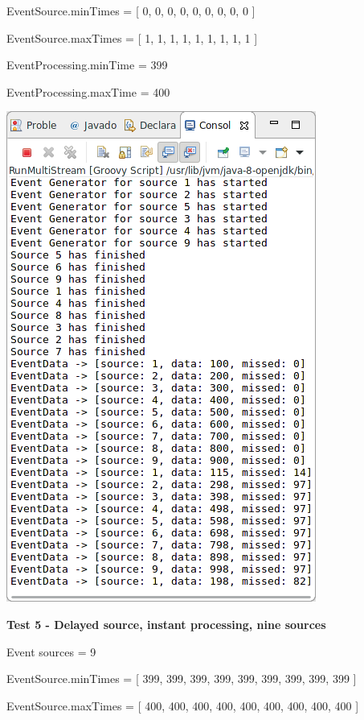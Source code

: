 EventSource.minTimes = [ 0, 0, 0, 0, 0, 0, 0, 0, 0 ]

EventSource.maxTimes = [ 1, 1, 1, 1, 1, 1, 1, 1, 1 ]

EventProcessing.minTime = 399

EventProcessing.maxTime = 400

\includegraphics[width=\textwidth/2]{img/screenshots/9-2-4.png}

\textbf{Test 5 - Delayed source, instant processing, nine sources}

Event sources = 9

EventSource.minTimes = [ 399, 399, 399, 399, 399, 399, 399, 399, 399 ]

EventSource.maxTimes = [ 400, 400, 400, 400, 400, 400, 400, 400, 400 ]

